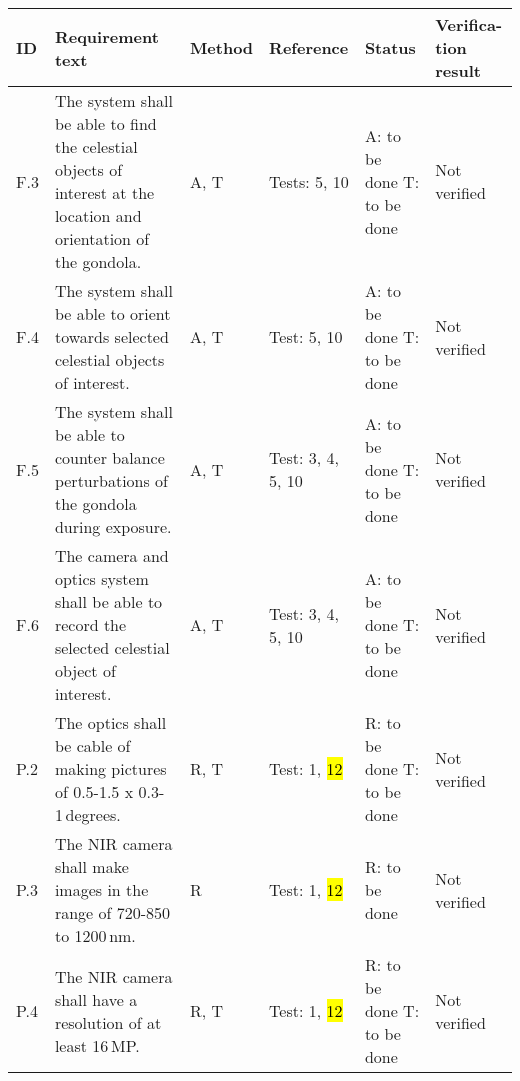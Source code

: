 
\makeatletter
\renewcommand\@makefntext[1]{\leftskip=3em\hskip-1em\@makefnmark#1}
\makeatother

\begin{longtable}[]{|m{}| m{}|m{}|m{}|m{}|m{}|}

\hline
\textbf{ID} & \textbf{Requirement text} & \textbf{Method} & \textbf{Reference} & \textbf{Status} & \textbf{Verifica-tion result} \\\hline

\rowcolor{yellow} F.3 & The system shall be able to find the celestial objects of interest at the location and orientation of the gondola.
& A, T & Tests: 5, 10 & A: to be done \newline T: to be done & Not verified \\\hline

\rowcolor{yellow} F.4 & The system shall be able to orient towards selected celestial objects of interest.
& A, T & Test: 5, 10 & A: to be done \newline T: to be done & Not verified \\\hline

\rowcolor{yellow} F.5 & The system shall be able to counter balance perturbations of the gondola during exposure.
& A, T & Test: 3, 4, 5, 10 & A: to be done \newline T: to be done & Not verified \\\hline

\rowcolor{yellow} F.6 & The camera and optics system shall be able to record the selected celestial object of interest.
& A, T & Test: 3, 4, 5, 10 & A: to be done \newline T: to be done & Not verified \\\hline




P.2 & The optics shall be cable of making pictures of 0.5-1.5 x 0.3-1\,degrees.
& R, T & Test: 1, \hl{12} & R: to be done \newline T: to be done  & Not verified \\\hline

P.3 & The NIR camera shall make images in the range of 720-850 to 1200\,nm.
& R & Test: 1, \hl{12} & R: to be done  & Not verified \\\hline

P.4 & The NIR camera shall have a resolution of at least 16\,MP.
& R, T& Test: 1, \hl{12} & R: to be done \newline T: to be done & Not verified \\\hline


\end{longtable}
